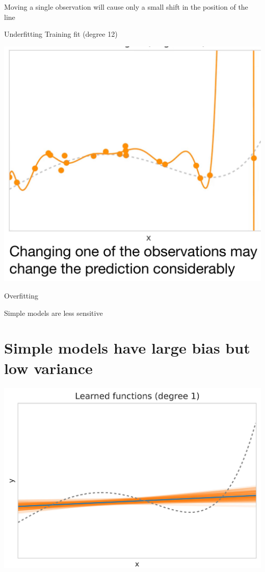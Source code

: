 \documentclass[10pt]{article}
\begin{document}
Moving a single observation will cause only a small shift in the position of the line

Underfitting
Training fit (degree 12)

\begin{center}
\includegraphics[max width=\textwidth]{2023_12_30_442f876157646883c2c9g-10}
\end{center}

Overfitting

Simple models are less sensitive

\section*{Simple models have large bias but low variance}
\begin{center}
\includegraphics[max width=\textwidth]{2023_12_30_442f876157646883c2c9g-11}
\end{center}
\end{document}
